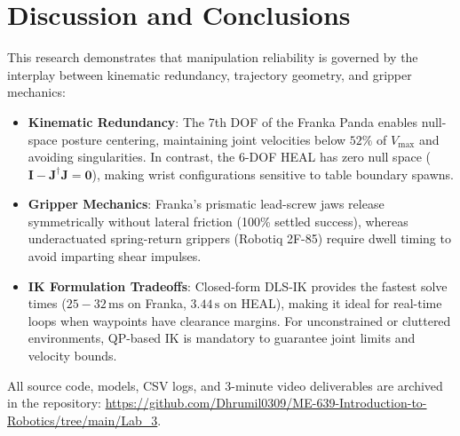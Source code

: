 \documentclass[10pt,twocolumn]{article}
\begin{document}
\section{Discussion and Conclusions}
This research demonstrates that manipulation reliability is governed by the interplay between kinematic redundancy, trajectory geometry, and gripper mechanics:
\begin{itemize}
    \item \textbf{Kinematic Redundancy}: The 7th DOF of the Franka Panda enables null-space posture centering, maintaining joint velocities below $52\%$ of $V_{\max}$ and avoiding singularities. In contrast, the 6-DOF HEAL has zero null space ($\mathbf{I} - \mathbf{J}^\dagger \mathbf{J} = \mathbf{0}$), making wrist configurations sensitive to table boundary spawns.
    \item \textbf{Gripper Mechanics}: Franka's prismatic lead-screw jaws release symmetrically without lateral friction (100\% settled success), whereas underactuated spring-return grippers (Robotiq 2F-85) require dwell timing to avoid imparting shear impulses.
    \item \textbf{IK Formulation Tradeoffs}: Closed-form DLS-IK provides the fastest solve times ($25-32\,\text{ms}$ on Franka, $3.44\,\text{s}$ on HEAL), making it ideal for real-time loops when waypoints have clearance margins. For unconstrained or cluttered environments, QP-based IK is mandatory to guarantee joint limits and velocity bounds.
\end{itemize}

All source code, models, CSV logs, and 3-minute video deliverables are archived in the repository: \url{https://github.com/Dhrumil0309/ME-639-Introduction-to-Robotics/tree/main/Lab_3}.
\end{document}

